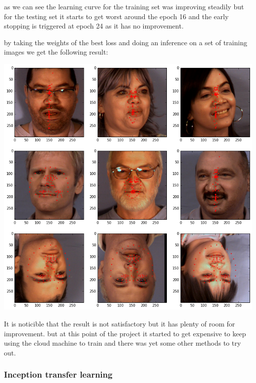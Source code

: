 \documentclass[11pt]{article}
\begin{document}
as we can see the learning curve for the training set was improving steadily
but for the testing set it starts to get worst  around the epoch 16 and the
early stopping is triggered at epoch 24 as it has no improvement.

by taking the weights of the best loss and doing an inference on a set of
training images we get the following result: 

\begin{center}
\includegraphics[width=.9\linewidth]{./images/mymodelTest.png}
\end{center}

It is noticible that the result is not satisfactory but it has plenty of room
for improvement. but at this point of the project it started to get expensive
to keep using the cloud machine to train and there was yet some other methods
to try out.  

\subsubsection{Inception transfer learning}
\label{sec:org04d8222}
\end{document}
